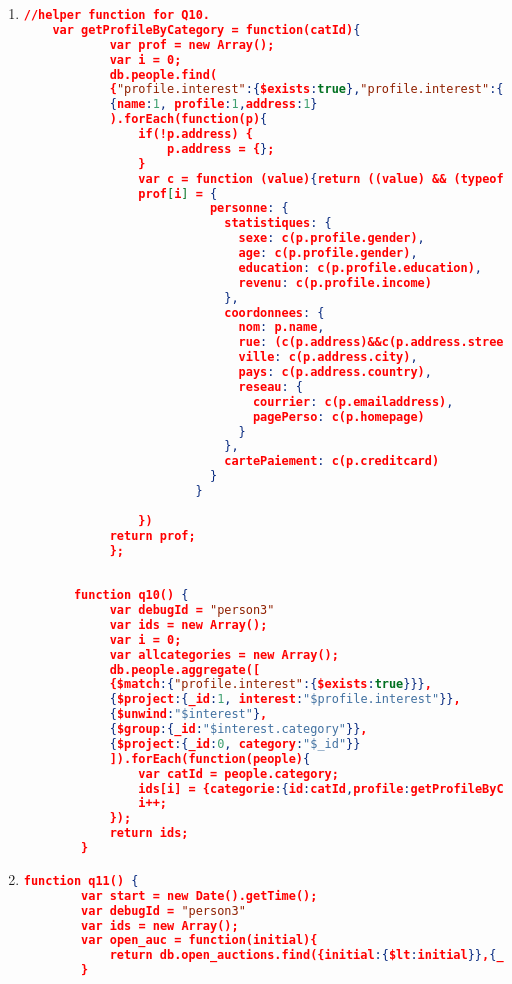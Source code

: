 \begin{enumerate}[label=Q\arabic*.]
	
    \item %
	\begin{lstlisting}[language=JSON,   basicstyle=\scriptsize]
	//helper function for Q10.
    var getProfileByCategory = function(catId){
    		var prof = new Array();
    		var i = 0;
    		db.people.find(
    		{"profile.interest":{$exists:true},"profile.interest":{"$elemMatch": {category:catId}}},
    		{name:1, profile:1,address:1}
    		).forEach(function(p){
    			if(!p.address) {
    				p.address = {};
    			}
    			var c = function (value){return ((value) && (typeof value !== "undefined")) ? value : "";}; 
    			prof[i] = {
                          personne: {
                            statistiques: {
                              sexe: c(p.profile.gender),
                              age: c(p.profile.gender),
                              education: c(p.profile.education),
                              revenu: c(p.profile.income)
                            },
                            coordonnees: {
                              nom: p.name,
                              rue: (c(p.address)&&c(p.address.street)),
                              ville: c(p.address.city),
                              pays: c(p.address.country),
                              reseau: {
                                courrier: c(p.emailaddress),
                                pagePerso: c(p.homepage)
                              }
                            },
                            cartePaiement: c(p.creditcard)
                          }
                        }
                            			
    			})
    		return prof;
    		};
    		
    		
	   function q10() {
        	var debugId = "person3"
        	var ids = new Array();
        	var i = 0;
        	var allcategories = new Array();
        	db.people.aggregate([
        	{$match:{"profile.interest":{$exists:true}}},
        	{$project:{_id:1, interest:"$profile.interest"}},
        	{$unwind:"$interest"},
        	{$group:{_id:"$interest.category"}},
        	{$project:{_id:0, category:"$_id"}}
        	]).forEach(function(people){
        		var catId = people.category;
        		ids[i] = {categorie:{id:catId,profile:getProfileByCategory(catId)}}
        		i++;
        	});
        	return ids;
        }
	\end{lstlisting}
	
	
    \item %
	\begin{lstlisting}[language=JSON,   basicstyle=\scriptsize]
	  function q11() {
    	var start = new Date().getTime();
    	var debugId = "person3"
    	var ids = new Array();
    	var open_auc = function(initial){
    		return db.open_auctions.find({initial:{$lt:initial}},{_id:1}).count();
    	}
    	

\end{lstlisting}
\end{enumerate}
